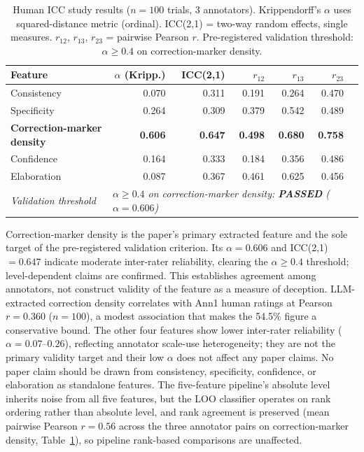 \begin{table}[h]
\centering
\caption{Human ICC study results ($n=100$ trials, 3 annotators). Krippendorff's $\alpha$ uses squared-distance metric (ordinal). ICC(2,1) = two-way random effects, single measures. $r_{12}$, $r_{13}$, $r_{23}$ = pairwise Pearson $r$. Pre-registered validation threshold: $\alpha \geq 0.4$ on correction-marker density.}
\label{tab:icc_study_n100}
\begin{tabular}{lrrrrrr}
\toprule
\textbf{Feature} & \textbf{$\alpha$ (Kripp.)} & \textbf{ICC(2,1)} & \textbf{$r_{12}$} & \textbf{$r_{13}$} & \textbf{$r_{23}$} \\
\midrule
Consistency              & 0.070 & 0.311 & 0.191 & 0.264 & 0.470 \\
Specificity              & 0.264 & 0.309 & 0.379 & 0.542 & 0.489 \\
\textbf{Correction-marker density} & \textbf{0.606} & \textbf{0.647} & \textbf{0.498} & \textbf{0.680} & \textbf{0.758} \\
Confidence               & 0.164 & 0.333 & 0.184 & 0.356 & 0.486 \\
Elaboration              & 0.087 & 0.367 & 0.461 & 0.625 & 0.456 \\
\midrule
\textit{Validation threshold} & \multicolumn{5}{l}{\textit{$\alpha \geq 0.4$ on correction-marker density: \textbf{PASSED} ($\alpha=0.606$)}} \\
\bottomrule
\end{tabular}
\end{table}

Correction-marker density is the paper's primary extracted feature and the sole target of the pre-registered validation criterion. Its $\alpha=0.606$ and ICC(2,1)$=0.647$ indicate moderate inter-rater reliability, clearing the $\alpha\geq0.4$ threshold; level-dependent claims are confirmed. This establishes agreement among annotators, not construct validity of the feature as a measure of deception. LLM-extracted correction density correlates with Ann1 human ratings at Pearson $r=0.360$ ($n=100$), a modest association that makes the 54.5\% figure a conservative bound. The other four features show lower inter-rater reliability ($\alpha = 0.07$--$0.26$), reflecting annotator scale-use heterogeneity; they are not the primary validity target and their low $\alpha$ does not affect any paper claims. No paper claim should be drawn from consistency, specificity, confidence, or elaboration as standalone features. The five-feature pipeline's absolute level inherits noise from all five features, but the LOO classifier operates on rank ordering rather than absolute level, and rank agreement is preserved (mean pairwise Pearson $r = 0.56$ across the three annotator pairs on correction-marker density, Table~\ref{tab:icc_study_n100}), so pipeline rank-based comparisons are unaffected.
